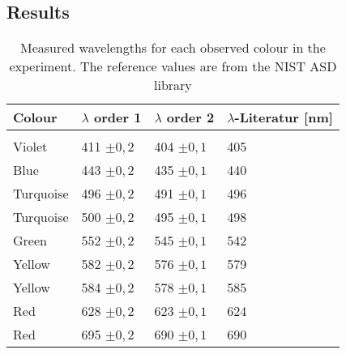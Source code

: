 \subsection{Results}


\begin{table}[ht]
	\begin{tabularx}{\textwidth}{XM{3cm}M{3cm}M{3cm}}%
		\toprule 
		\textbf{Colour}& \textbf{$\lambda$ order 1} \qquad [\si{\nano\m}]  &  \textbf{$\lambda$ order 2}\qquad [\si{\nano\m}]  & \textbf{$\lambda$-Literatur} [\si{\nano\m}]  \\
		\hline
		&&&\\[-5pt]
		Violet		& 411 $\pm 0,2$  & 404 $\pm 0,1$ & 405	\\[5pt]
		Blue		& 443 $\pm 0,2$  & 435 $\pm 0,1$ & 440	\\[5pt]
		Turquoise	& 496 $\pm 0,2$  & 491 $\pm 0,1$ & 496	\\[5pt]
		Turquoise	& 500 $\pm 0,2$  & 495 $\pm 0,1$ & 498	\\[5pt]
		Green		& 552 $\pm 0,2$  & 545 $\pm 0,1$ & 542  \\[5pt]
		Yellow		& 582 $\pm 0,2$  & 576 $\pm 0,1$ & 579	\\[5pt]
		Yellow		& 584 $\pm 0,2$  & 578 $\pm 0,1$ & 585	\\[5pt]
		Red			& 628 $\pm 0,2$  & 623 $\pm 0,1$ & 624	\\[5pt]
		Red			& 695 $\pm 0,2$  & 690 $\pm 0,1$ & 690	\\[5pt]
		\bottomrule 
	\end{tabularx}
	\caption{Measured wavelengths for each observed colour in the experiment. The reference values are from the NIST ASD library}
	\label{tab::period}
\end{table}